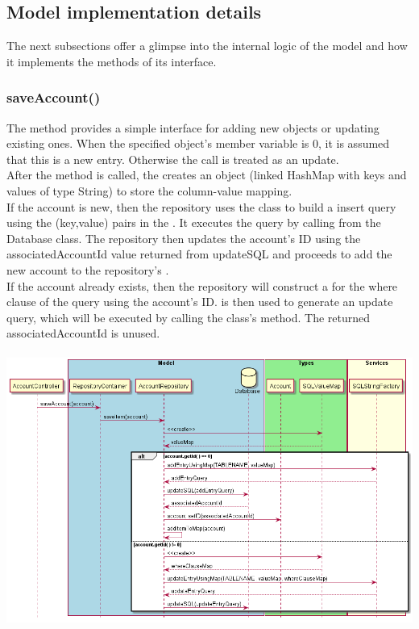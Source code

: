 \documentclass[12pt]{article}
\begin{document}
\subsection{Model implementation details}
The next subsections offer a glimpse into the internal logic of the model and how it implements the methods of its interface.

\subsubsection{saveAccount()} \label{sec:modelSaveDetail}
The  method provides a simple interface for adding new  objects or updating existing ones. When the specified  object's  member variable is 0, it is assumed that this is a new entry. Otherwise the call is treated as an update. \\

After the  method is called, the  creates an  object (linked HashMap with keys and values of type String) to store the column-value mapping. \\

If the account is new, then the repository uses the  class to build a  insert query using the (key,value) pairs in the . It executes the query by calling  from the Database class. The repository then updates the account's ID using the associatedAccountId value returned from updateSQL and proceeds to add the new account to the repository's .\\

If the account already exists, then the repository will construct a  for the where clause of the query using the account's ID.  is then used to generate an update query, which will be executed by calling the  class's  method. The returned associatedAccountId is unused. \\
\\
\includegraphics[width=\textwidth,height=\textheight,keepaspectratio]{diagrams/sequence/addAccountImp.png}
\bigskip
\end{document}
